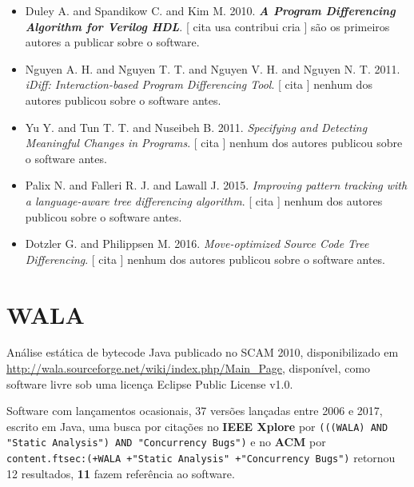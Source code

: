 \begin{itemize}
\item Duley A. and Spandikow C. and Kim M.
      2010.
        \textbf{\textit{ A Program Differencing Algorithm for Verilog HDL}}.
      [
          cita
          usa
          contribui
          cria
      ]
são os primeiros autores a publicar sobre o software.
\item Nguyen A. H. and Nguyen T. T. and Nguyen V. H. and Nguyen N. T.
      2011.
        \textit{ iDiff: Interaction-based Program Differencing Tool}.
      [
          cita
      ]
nenhum dos autores publicou sobre o software antes.
\item Yu Y. and Tun T. T. and Nuseibeh B.
      2011.
        \textit{ Specifying and Detecting Meaningful Changes in Programs}.
      [
          cita
      ]
nenhum dos autores publicou sobre o software antes.
\item Palix N. and Falleri R. J. and Lawall J.
      2015.
        \textit{ Improving pattern tracking with a language-aware tree differencing algorithm}.
      [
          cita
      ]
nenhum dos autores publicou sobre o software antes.
\item Dotzler G. and Philippsen M.
      2016.
        \textit{ Move-optimized Source Code Tree Differencing}.
      [
          cita
      ]
nenhum dos autores publicou sobre o software antes.
\end{itemize}
\section{WALA}

Análise estática de bytecode Java
publicado no SCAM 2010,
disponibilizado em \url{http://wala.sourceforge.net/wiki/index.php/Main_Page},
disponível,
como software livre
sob uma licença Eclipse Public License v1.0.

Software com lançamentos ocasionais,
37 versões lançadas
entre 2006 e 2017,
escrito em Java,
uma busca por citações no {\bf IEEE Xplore} por
\texttt{(((WALA) AND "Static Analysis") AND "Concurrency Bugs")}
e no {\bf ACM} por
\texttt{content.ftsec:(+WALA +"Static Analysis" +"Concurrency Bugs")}
retornou
12 resultados,
{\bf 11} fazem referência ao software.


